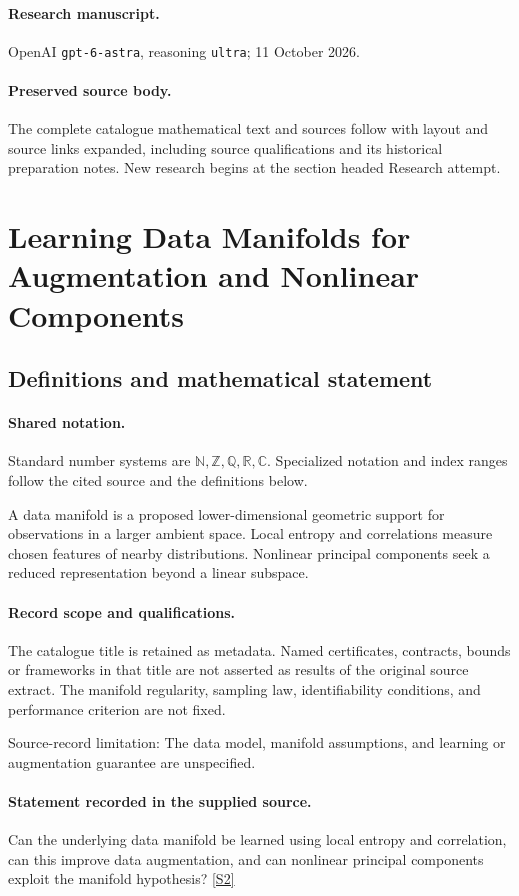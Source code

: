 \documentclass[11pt]{article}
\begin{document}
\paragraph{Research manuscript.} OpenAI \texttt{gpt-6-astra}, reasoning \texttt{ultra}; 11 October 2026.
\paragraph{Preserved source body.} The complete catalogue mathematical text and sources follow with layout and source links expanded, including source qualifications and its historical preparation notes. New research begins at the section headed Research attempt.

\section{Learning Data Manifolds for Augmentation and Nonlinear Components}\label{statement}

\subsection{Definitions and mathematical statement}

\paragraph{Shared notation.}Standard number systems are $\mathbb N,\mathbb Z,\mathbb Q,\mathbb R,\mathbb C$. Specialized notation and index ranges follow the cited source and the definitions below.


A data manifold is a proposed lower-dimensional geometric support for observations in a larger ambient space. Local entropy and correlations measure chosen features of nearby distributions. Nonlinear principal components seek a reduced representation beyond a linear subspace.
\paragraph{Record scope and qualifications.}
The catalogue title is retained as metadata. Named certificates, contracts, bounds or frameworks in that title are not asserted as results of the original source extract.
The manifold regularity, sampling law, identifiability conditions, and performance criterion are not fixed.

Source-record limitation: The data model, manifold assumptions, and learning or augmentation guarantee are unspecified.
\paragraph{Statement recorded in the supplied source.}
Can the underlying data manifold be learned using local entropy and correlation, can this improve data augmentation, and can nonlinear principal components exploit the manifold hypothesis? \href{https://doi.org/10.4171/owr/2024/21}{[S2]}
\end{document}
